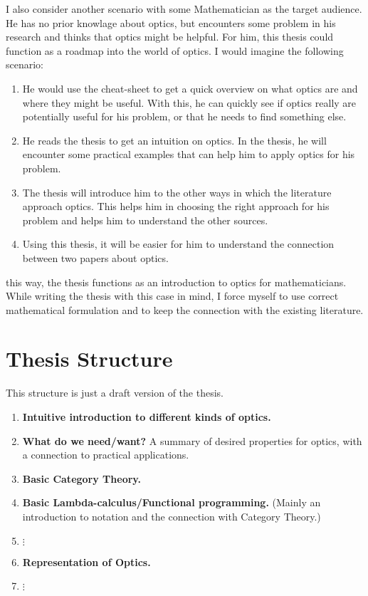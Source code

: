 \documentclass{article}
\begin{document}
I also consider another scenario with some Mathematician as the target audience. He has no prior knowlage about optics, but encounters some problem in his research and thinks that optics might be helpful. For him, this thesis could function as a roadmap into the world of optics. I would imagine the following scenario:
\begin{enumerate}
  \item He would use the cheat-sheet to get a quick overview on what optics are and where they might be useful. With this, he can quickly see if optics really are potentially useful for his problem, or that he needs to find something else.
  \item He reads the thesis to get an intuition on optics. In the thesis, he will encounter some practical examples that can help him to apply optics for his problem.
  \item The thesis will introduce him to the other ways in which the literature approach optics. This helps him in choosing the right approach for his problem and helps him to understand the other sources.
  \item Using this thesis, it will be easier for him to understand the connection between two papers about optics.
\end{enumerate}
this way, the thesis functions as an introduction to optics for mathematicians. While writing the thesis with this case in mind, I force myself to use correct mathematical formulation and to keep the connection with the existing literature.

\section{Thesis Structure}

This structure is just a draft version of the thesis.

\begin{enumerate}
  \item \textbf{Intuitive introduction to different kinds of optics.}
  \item \textbf{What do we need/want?} A summary of desired properties for optics, with a connection to practical applications.
  \item \textbf{Basic Category Theory.}
  \item \textbf{Basic Lambda-calculus/Functional programming.} (Mainly an introduction to notation and the connection with Category Theory.)
  \item $\vdots$
  \item \textbf{Representation of Optics.}
  \item $\vdots$
\end{enumerate}
\end{document}
